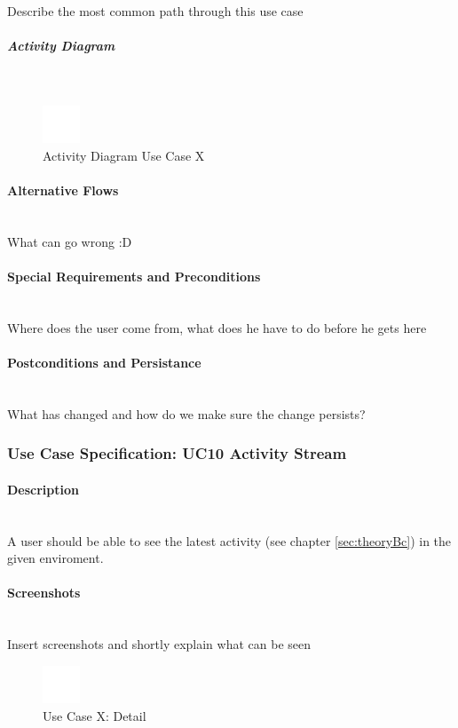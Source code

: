 Describe the most common path through this use case

\subparagraph{Activity Diagram}\mbox{}\\
\begin{figure}[h]
	\centering
	\includegraphics[width=0.1\textwidth]{Content/Domain/placeholder.png}
	\caption{Activity Diagram Use Case X}
	\label{fig:label10}
\end{figure}

\paragraph*{Alternative Flows}\mbox{}\\
What can go wrong :D

\paragraph*{Special Requirements and Preconditions}\mbox{}\\
Where does the user come from, what does he have to do before he gets here

\paragraph*{Postconditions and Persistance}\mbox{}\\
What has changed and how do we make sure the change persists?

\newpage
\subsubsection{Use Case Specification: \ac{UC}10 Activity Stream}
\label{sec:domainBbk}

\paragraph*{Description}\mbox{}\\
A user should be able to see the latest activity (see chapter \ref{sec:theoryBc}) in the given enviroment.

\paragraph*{Screenshots}\mbox{}\\
Insert screenshots and shortly explain what can be seen
\begin{figure}[h] 
	\centering
	\includegraphics[width=0.1\textwidth]{Content/Domain/placeholder.png}
	\caption{Use Case X: Detail}
	\label{fig:label1}
\end{figure}

